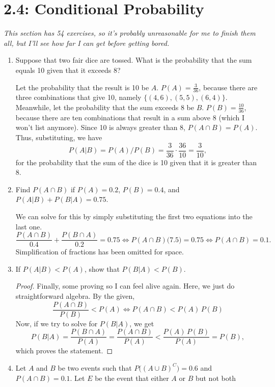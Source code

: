 \documentclass{article}
\begin{document}
\section*{2.4: Conditional Probability}
\textit{This section has 54 exercises, so it's probably unreasonable for me to finish them all, but I'll see how far I can get before getting bored. }
\begin{enumerate}
    \item Suppose that two fair dice are tossed. What is the probability that the sum equals 10 given that it exceeds 8?\begin{solution}
        Let the probability that the result is 10 be \(A\). \(P(A) = \frac{3}{36}\), because there are three combinations that give 10, namely \(\lbrace(4,6),(5,5),(6,4)\rbrace\). Meanwhile, let the probability 
        that the sum  exceeds 8 be \(B\). \(P(B) = \frac{10}{36}\), because there are ten combinations that result in a sum above 8 (which I won't list anymore). Since 10 is always greater than 8, 
        \(P(A\cap{}B) = P(A)\). Thus, substituting, we have\[
            P(A|B) = P(A) / P(B) = \frac{3}{36} \cdot \frac{36}{10} = \frac{3}{10},
        \] for the probability that the sum of the dice is 10 given that it is greater than 8. 
    \end{solution}
    \item Find \(P(A\cap{}B)\) if \(P(A) = 0.2\), \(P(B) = 0.4\), and \(P(A|B) + P(B|A) =0.75\).\begin{solution}
        We can solve for this by simply substituting the first two equations into the last one.\[
            \frac{P(A\cap{}B)}{0.4} + \frac{P(B\cap{}A)}{0.2} =0.75 \Longleftrightarrow P(A\cap{}B) \big(7.5\big) = 0.75 \Longleftrightarrow P(A\cap{}B) = 0.1. 
        \] Simplification of fractions has been omitted for space. 
    \end{solution}
    \item If \(P(A|B) < P(A)\), show that \(P(B|A) < P(B)\).\begin{proof}
        Finally, some proving so I can feel alive again. Here, we just do straightforward algebra. By the given,\[
            \frac{P(A\cap{}B)}{P(B)} < P(A) \Longleftrightarrow
            P(A\cap{}B) < P(A)\,P(B)
        \] Now, if we try to solve for \(P(B|A)\), we get\[
            P(B|A) = \frac{P(B\cap{}A)}{P(A)} = \frac{P(A\cap{}B)}{P(A)}< \frac{P(A)\,P(B)}{P(A)} = P(B),
        \] which proves the statement. 
    \end{proof}
    \item Let \(A\) and \(B\) be two events such that \(P\bigl({(A\cup{}B)}^C\bigr) = 0.6\) and \(P(A\cap{}B) = 0.1\). Let \(E\) be the event that either \(A\) or \(B\) but not both 

\end{enumerate}
\end{document}
